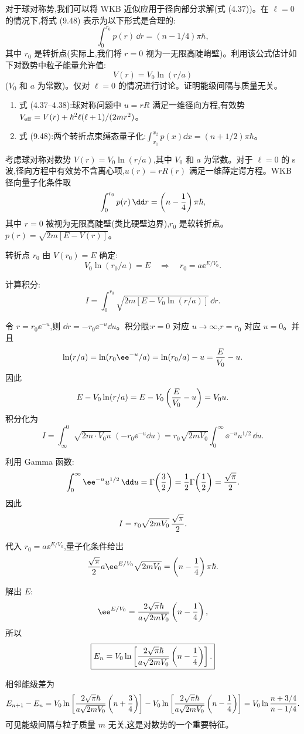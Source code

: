 \begin{question}
对于球对称势,我们可以将 WKB 近似应用于径向部分求解(式 (4.37))。在 $\ell=0$ 的情况下,将式 (9.48) 表示为以下形式是合理的:
\[
\int_0^{r_0}p(r)\,\dd r=(n-1/4)\pi\hbar,
\]
其中 $r_0$ 是转折点(实际上,我们将 $r=0$ 视为一无限高陡峭壁)。利用该公式估计如下对数势中粒子能量允许值:
\[
V(r)=V_0\ln(r/a)
\]
($V_0$ 和 $a$ 为常数)。仅对 $\ell=0$ 的情况进行讨论。证明能级间隔与质量无关。

\par\smallskip
{}
\begin{enumerate}[leftmargin=2.2em,itemsep=0.12em,topsep=0.12em,parsep=0pt]
\item 式 (4.37--4.38):球对称问题中 $u=rR$ 满足一维径向方程,有效势 $V_{\rm eff}=V(r)+\hbar^2\ell(\ell+1)/(2mr^2)$。
\item 式 (9.48):两个转折点束缚态量子化:$\int_{x_1}^{x_2}p(x)\dd x=(n+1/2)\pi\hbar$。
\end{enumerate}

\end{question}
\begin{solution}
考虑球对称对数势 $V(r)=V_0\ln(r/a)$,其中 $V_0$ 和 $a$ 为常数。对于 $\ell=0$ 的 s 波,径向方程中有效势不含离心项,$u(r)=rR(r)$ 满足一维薛定谔方程。WKB 径向量子化条件取
\[
\int_0^{r_0}p(r)\,\dd r=\left(n-{1\over4}\right)\pi\hbar,
\]
其中 $r=0$ 被视为无限高陡壁(类比硬壁边界),$r_0$ 是软转折点。$p(r)=\sqrt{2m[E-V(r)]}$。

转折点 $r_0$ 由 $V(r_0)=E$ 确定:
\[
V_0\ln(r_0/a)=E\quad\Longrightarrow\quad r_0=a \ee^{E/V_0}.
\]

计算积分:
\[
I=\int_0^{r_0}\sqrt{2m\left[E-V_0\ln(r/a)\right]}\,\dd r.
\]

令 $r=r_0\ee^{-u}$,则 $\dd r=-r_0\ee^{-u}\dd u$。积分限:$r=0$ 对应 $u\to\infty$,$r=r_0$ 对应 $u=0$。并且
\[
\ln(r/a)=\ln(r_0\ee^{-u}/a)=\ln(r_0/a)-u={E\over V_0}-u.
\]
因此
\[
E-V_0\ln(r/a)=E-V_0\left({E\over V_0}-u\right)=V_0u.
\]
积分化为
\[
I=\int_\infty^0\sqrt{2m\cdot V_0u}\;(-r_0\ee^{-u}\dd u)
=r_0\sqrt{2mV_0}\int_0^\infty \ee^{-u}u^{1/2}\,\dd u.
\]

利用 Gamma 函数:
\[
\int_0^\infty \ee^{-u}u^{1/2}\,\dd u=\Gamma\!\left({3\over2}\right)
={1\over2}\Gamma\!\left({1\over2}\right)={\sqrt\pi\over2}.
\]
因此
\[
I=r_0\sqrt{2mV_0}\,{\sqrt\pi\over2}.
\]

代入 $r_0=a \ee^{E/V_0}$,量子化条件给出
\[
{\sqrt\pi\over2}a \ee^{E/V_0}\sqrt{2mV_0}=\left(n-{1\over4}\right)\pi\hbar.
\]

解出 $E$:
\[
\ee^{E/V_0}={2\sqrt\pi\hbar\over a\sqrt{2mV_0}}\left(n-{1\over4}\right),
\]
所以
\[
\boxed{E_n=V_0\ln\left[{2\sqrt\pi\hbar\over a\sqrt{2mV_0}}
\left(n-{1\over4}\right)\right].}
\]

相邻能级差为
\[
E_{n+1}-E_n
=V_0\ln\left[{2\sqrt\pi\hbar\over a\sqrt{2mV_0}}\left(n+{3\over4}\right)\right]
-V_0\ln\left[{2\sqrt\pi\hbar\over a\sqrt{2mV_0}}\left(n-{1\over4}\right)\right]
=V_0\ln{n+3/4\over n-1/4}.
\]
可见能级间隔与粒子质量 $m$ 无关,这是对数势的一个重要特征。
\end{solution}

